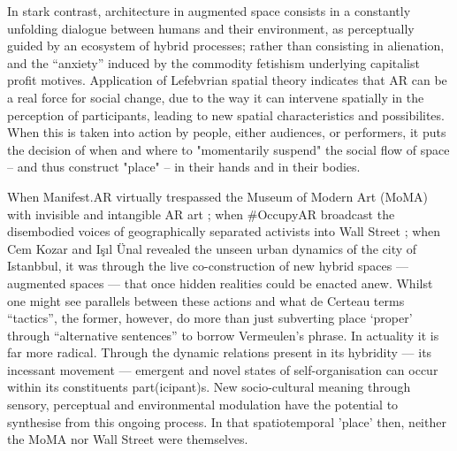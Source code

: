 In stark contrast, architecture in augmented space consists in a constantly unfolding dialogue between humans and their environment, as perceptually guided by an ecosystem of hybrid processes; rather than consisting in alienation, and the “anxiety” induced by the commodity fetishism underlying capitalist profit motives. Application of Lefebvrian spatial theory indicates that AR can be a real force for social change, due to the way it can intervene spatially in the perception of participants, leading to new spatial characteristics and possibilites. When this is taken into action by people, either audiences, or performers, it puts the decision of when and where to "momentarily suspend" the social flow of space -- and thus construct "place" -- in their hands and in their bodies.

When Manifest.AR virtually trespassed the Museum of Modern Art (MoMA) with invisible and intangible AR art \citep{veenhof2010}; when \#OccupyAR broadcast the disembodied voices of geographically separated activists into Wall Street \citep{skwarek2018}; when Cem Kozar and Işıl Ünal \citeyearpar{thiel2011,thiel2018} revealed the unseen urban dynamics of the city of Istanbbul, it was through the live co-construction of new hybrid spaces — augmented spaces — that once hidden realities could be enacted anew. Whilst one might see parallels between these actions and what de Certeau terms “tactics”, the former, however, do more than just subverting place ‘proper’ through “alternative sentences” to borrow Vermeulen’s phrase. In actuality it is far more radical. Through the dynamic relations present in its hybridity — its incessant movement — emergent and novel states of self-organisation can occur within its constituents part(icipant)s. New socio-cultural meaning through sensory, perceptual and environmental modulation have the potential to synthesise from this ongoing process. In that spatiotemporal 'place' then, neither the MoMA nor Wall Street were themselves.


